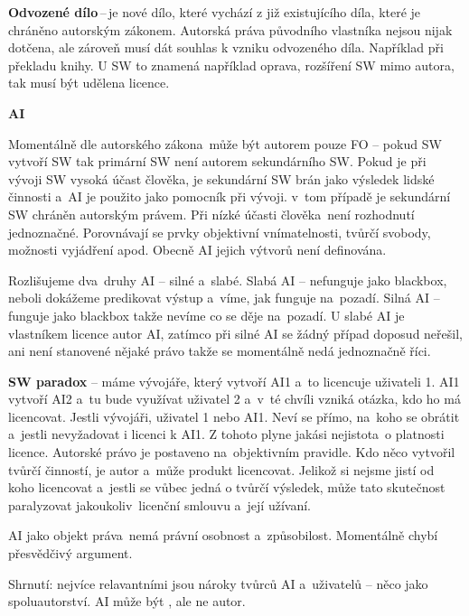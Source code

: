 \textbf{Odvozené dílo}\,--\,je nové dílo, které vychází z již existujícího díla, které je chráněno autorským zákonem. Autorská práva původního vlastníka nejsou nijak dotčena, ale zároveň musí dát souhlas k vzniku odvozeného díla. Například při překladu knihy. U SW to znamená například oprava, rozšíření SW mimo autora, tak musí být udělena licence. 

\vspace{1cm}
\noindent\textbf{AI}

\noindent Momentálně dle autorského zákona~může být autorem pouze FO -- pokud SW vytvoří SW tak primární SW není autorem sekundárního SW. Pokud je při vývoji SW vysoká účast člověka, je sekundární SW brán jako výsledek lidské činnosti a~AI je použito jako pomocník při vývoji. v~tom případě je sekundární SW chráněn autorským právem. Při nízké účasti člověka~není rozhodnutí jednoznačné. Porovnávají se prvky objektivní vnímatelnosti, tvůrčí svobody, možnosti vyjádření apod. Obecně AI jejich výtvorů není definována. 

Rozlišujeme dva~druhy AI -- silné a~slabé. Slabá AI -- nefunguje jako blackbox, neboli dokážeme predikovat výstup a~víme, jak funguje na~pozadí. Silná AI -- funguje jako blackbox takže nevíme co se děje na~pozadí. U slabé AI je vlastníkem licence autor AI, zatímco při silné AI se žádný případ doposud neřešil, ani není stanovené nějaké právo takže se momentálně nedá jednoznačně říci.

\textbf{SW paradox} -- máme vývojáře, který vytvoří AI1 a~to licencuje uživateli 1. AI1 vytvoří AI2 a~tu bude využívat uživatel 2 a~v~té chvíli vzniká otázka, kdo ho má licencovat. Jestli vývojáři, uživatel 1 nebo AI1. Neví se přímo, na~koho se obrátit a~jestli nevyžadovat i licenci k AI1. Z tohoto plyne jakási nejistota~o platnosti licence. Autorské právo je postaveno na~objektivním pravidle. Kdo něco vytvořil tvůrčí činností, je autor a~může produkt licencovat. Jelikož si nejsme jistí od koho licencovat a~jestli se vůbec jedná o tvůrčí výsledek, může tato skutečnost paralyzovat jakoukoliv~licenční smlouvu a~její užívaní.

AI jako objekt práva~nemá právní osobnost a~způsobilost. Momentálně chybí přesvědčivý argument. 

Shrnutí: nejvíce relavantními jsou nároky tvůrců AI a~uživatelů -- něco jako spoluautorství. AI může být , ale ne autor.










